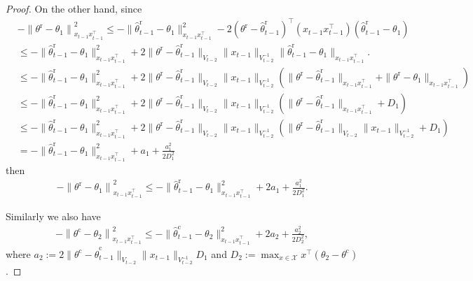 \documentclass[accepted]{uai2025} %
\theoremstyle{plain}
\theoremstyle{definition}
\theoremstyle{remark}
\newcommand{\truethetac}{\theta^{\mathrm{c}}}
\newcommand{\truethetar}{\theta^{\mathrm{r}}}
\begin{document}
\begin{proof}
On the other hand, since
\begin{align*}
	 &-{\left \| \truethetar - \theta_1 \right\|^2_{x_{t-1} x_{t-1}^\top}}   \leq  - \| \hat{\theta}_{t-1}^\mathrm{r} - \theta_1 \|^2_{x_{t-1} x_{t-1}^\top} - 2 (\truethetar - \hat{\theta}_{t-1}^\mathrm{r})^\top (x_{t-1} x_{t-1}^\top) (\hat{\theta}_{t-1}^\mathrm{r} - \theta_1) \\
	 &\leq - \| \hat{\theta}_{t-1}^\mathrm{r} - \theta_1 \|^2_{x_{t-1} x_{t-1}^\top}  + 2 \| \truethetar - \hat{\theta}_{t-1}^\mathrm{r} \|_{V_{t-2}} \| x_{t-1} \|_{V_{t-2}^{-1}} \| \hat{\theta}_{t-1}^\mathrm{r} - \theta_1 \|_{x_{t-1} x_{t-1}^\top}.
     \\&\leq - \| \hat{\theta}_{t-1}^\mathrm{r} - \theta_1 \|^2_{x_{t-1} x_{t-1}^\top}  + 2 \| \truethetar - \hat{\theta}_{t-1}^\mathrm{r} \|_{V_{t-2}} \| x_{t-1} \|_{V_{t-2}^{-1}}(\| \truethetar - \hat{\theta}_{t-1}^\mathrm{r} \|_{x_{t-1} x_{t-1}^\top} + \| \truethetar - \theta_1 \|_{x_{t-1} x_{t-1}^\top} )
     \\&\leq - \| \hat{\theta}_{t-1}^\mathrm{r} - \theta_1 \|^2_{x_{t-1} x_{t-1}^\top}  + 2 \| \truethetar - \hat{\theta}_{t-1}^\mathrm{r} \|_{V_{t-2}} \| x_{t-1} \|_{V_{t-2}^{-1}}( \| \truethetar - \hat{\theta}_{t-1}^\mathrm{r} \|_{x_{t-1} x_{t-1}^\top} + D_1)
     \\&\leq - \| \hat{\theta}_{t-1}^\mathrm{r} - \theta_1 \|^2_{x_{t-1} x_{t-1}^\top}  + 2 \| \truethetar - \hat{\theta}_{t-1}^\mathrm{r} \|_{V_{t-2}} \| x_{t-1} \|_{V_{t-2}^{-1}}(\| \truethetar - \hat{\theta}_{t-1}^\mathrm{r} \|_{V_{t-2}} \| x_{t-1} \|_{V_{t-2}^{-1}} + D_1)
     \\&=- \| \hat{\theta}_{t-1}^\mathrm{r} - \theta_1 \|^2_{x_{t-1} x_{t-1}^\top}+a_1+\frac{a_1^2}{2D_1^2}
\end{align*}
then
\begin{align*}
    -{\left \| \truethetar - \theta_1 \right\|^2_{x_{t-1} x_{t-1}^\top}}  \leq - \| \hat{\theta}_{t-1}^\mathrm{r} - \theta_1 \|^2_{x_{t-1} x_{t-1}^\top}+2a_1+\frac{a_1^2}{2D_1^2}.
\end{align*}

Similarly we also have
\begin{align*}
    -{\left \| \truethetac - \theta_2 \right\|^2_{x_{t-1} x_{t-1}^\top}}  \leq - \| \hat{\theta}_{t-1}^\mathrm{c} - \theta_2 \|^2_{x_{t-1} x_{t-1}^\top}+2a_2+\frac{a_2^2}{2D_2^2},
\end{align*}
where $a_2 := 2 \| \truethetac - \hat{\theta}_{t-1}^\mathrm{c} \|_{V_{t-2}} \| x_{t-1} \|_{V_{t-2}^{-1}} D_1$ and $ D_2:=\max_{x\in\mathcal{X}} x^\top (\theta_2-\truethetac)$.


\end{proof}
\end{document}
